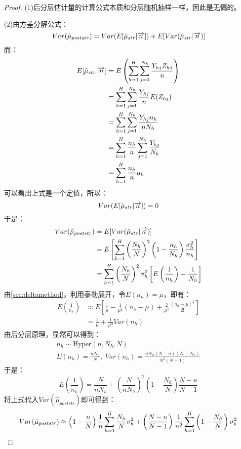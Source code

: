 \begin{proof}
	(1)后分层估计量的计算公式本质和分层随机抽样一样，因此是无偏的。\par
	(2)由方差分解公式：
	\begin{equation*}
		Var(\hat{\mu}_{poststr})=Var(E[\hat{\mu}_{str}\arrowvert\overrightarrow{n}])+E[Var(\hat{\mu}_{str}\arrowvert\overrightarrow{n})]
	\end{equation*}
	而：
	\begin{align*}
		E[\hat{\mu}_{str}\arrowvert\overrightarrow{n}]
		&=E\left(\sum_{h=1}^H\sum_{j=1}^{N_h}\frac{Y_{hj}Z_{hj}}{n}\right) \\
		&=\sum_{h=1}^H\sum_{j=1}^{N_h}\frac{Y_{hj}}{n}E(Z_{hj}) \\
		&=\sum_{h=1}^H\sum_{j=1}^{N_h}\frac{Y_{hj}n_h}{nN_h} \\
		&=\sum_{h=1}^H\frac{n_h}{n}\sum_{j=1}^{N_h}\frac{Y_{hj}}{N_h} \\
		&=\sum_{h=1}^H\frac{n_h}{n}\mu_h \\
	\end{align*}
	可以看出上式是一个定值，所以：
	\begin{equation*}
		Var(E[\hat{\mu}_{str}\arrowvert\overrightarrow{n}])=0
	\end{equation*}
	于是：
	\begin{align*}
		Var(\hat{\mu}_{poststr})
		&=E[Var(\hat{\mu}_{str}\arrowvert\overrightarrow{n})] \\
		&=E\left[\sum_{h=1}^H\left(\frac{N_h}{N}\right)^2\left(1-\frac{n_h}{N_h}\right)\frac{\sigma_h^2}{n_h}\right] \\
		&=\sum_{h=1}^H\left(\frac{N_h}{N}\right)^2\sigma_h^2\left[E\left(\frac{1}{n_h}\right)-\frac{1}{N_h}\right] \\
	\end{align*}
	由\cref{sec:deltamethod}，利用泰勒展开，令$E(n_h)=\mu$，即有：
	\begin{align*}
		E\left(\frac{1}{n_h}\right)
		&\approx E\left[\frac{1}{\mu}-\frac{1}{\mu^2}(n_h-\mu)+\frac{2}{\mu^3}\frac{(n_h-\mu)^2}{2!}\right] \\
		&=\frac{1}{\mu}+\frac{1}{\mu^3}Var(n_h)
	\end{align*}
	由后分层原理，显然可以得到：
	\begin{gather*}
		n_h\sim \text{Hyper}(n,N_h,N) \\
		E(n_h)=\frac{nN_h}{N},\;Var(n_h)=\frac{nN_h(N-n)(N-N_h)}{N^2(N-1)}
	\end{gather*}
	于是：
	\begin{equation*}
		E\left(\frac{1}{n_h}\right)=\frac{N}{nN_h}+\left(\frac{N}{nN_h}\right)^2\left(1-\frac{N_h}{N}\right)\frac{N-n}{N-1}
	\end{equation*}
	将上式代入$Var(\hat{\mu}_{poststr})$即可得到：
	\begin{equation*}
		Var(\hat{\mu}_{poststr})\approx\left(1-\frac{n}{N}\right)\frac{1}{n}\sum_{h=1}^H\frac{N_h}{N}\sigma_h^2+\left(\frac{N-n}{N-1}\right)\frac{1}{n^2}\sum_{h=1}^H\left(1-\frac{N_h}{N}\right)\sigma_h^2\qedhere
	\end{equation*}
\end{proof}












